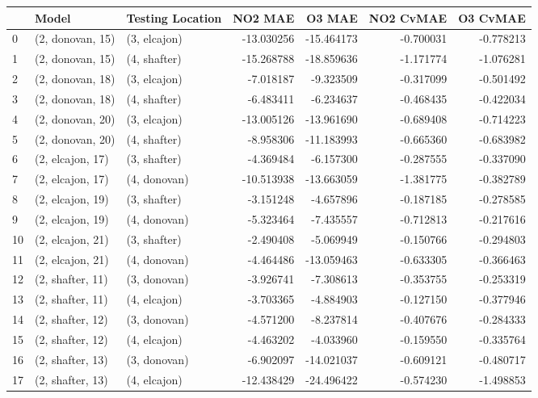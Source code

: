 \begin{tabular}{lllrrrr}
\toprule
{} &             Model & Testing Location &    NO2 MAE &     O3 MAE &  NO2 CvMAE &  O3 CvMAE \\
\midrule
0  &  (2, donovan, 15) &     (3, elcajon) & -13.030256 & -15.464173 &  -0.700031 & -0.778213 \\
1  &  (2, donovan, 15) &     (4, shafter) & -15.268788 & -18.859636 &  -1.171774 & -1.076281 \\
2  &  (2, donovan, 18) &     (3, elcajon) &  -7.018187 &  -9.323509 &  -0.317099 & -0.501492 \\
3  &  (2, donovan, 18) &     (4, shafter) &  -6.483411 &  -6.234637 &  -0.468435 & -0.422034 \\
4  &  (2, donovan, 20) &     (3, elcajon) & -13.005126 & -13.961690 &  -0.689408 & -0.714223 \\
5  &  (2, donovan, 20) &     (4, shafter) &  -8.958306 & -11.183993 &  -0.665360 & -0.683982 \\
6  &  (2, elcajon, 17) &     (3, shafter) &  -4.369484 &  -6.157300 &  -0.287555 & -0.337090 \\
7  &  (2, elcajon, 17) &     (4, donovan) & -10.513938 & -13.663059 &  -1.381775 & -0.382789 \\
8  &  (2, elcajon, 19) &     (3, shafter) &  -3.151248 &  -4.657896 &  -0.187185 & -0.278585 \\
9  &  (2, elcajon, 19) &     (4, donovan) &  -5.323464 &  -7.435557 &  -0.712813 & -0.217616 \\
10 &  (2, elcajon, 21) &     (3, shafter) &  -2.490408 &  -5.069949 &  -0.150766 & -0.294803 \\
11 &  (2, elcajon, 21) &     (4, donovan) &  -4.464486 & -13.059463 &  -0.633305 & -0.366463 \\
12 &  (2, shafter, 11) &     (3, donovan) &  -3.926741 &  -7.308613 &  -0.353755 & -0.253319 \\
13 &  (2, shafter, 11) &     (4, elcajon) &  -3.703365 &  -4.884903 &  -0.127150 & -0.377946 \\
14 &  (2, shafter, 12) &     (3, donovan) &  -4.571200 &  -8.237814 &  -0.407676 & -0.284333 \\
15 &  (2, shafter, 12) &     (4, elcajon) &  -4.463202 &  -4.033960 &  -0.159550 & -0.335764 \\
16 &  (2, shafter, 13) &     (3, donovan) &  -6.902097 & -14.021037 &  -0.609121 & -0.480717 \\
17 &  (2, shafter, 13) &     (4, elcajon) & -12.438429 & -24.496422 &  -0.574230 & -1.498853 \\

\end{tabular}
